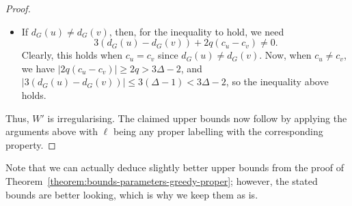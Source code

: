 \documentclass[a4paper,11pt,dvipsnames]{elsarticle}
\newcommand{\commenttext}[1]{ \begin{center} {\fbox{\begin{minipage}[h]{0.9 \linewidth}   {\textsf{ #1}} \end{minipage} }} \end{center}}
\newcommand{\Rom}[1]{{\color{blue}\commenttext{Rom : #1}}}
\newcommand{\Rom}[1]{}
\begin{document}
\begin{proof}
\begin{itemize}
    \item If $d_G(u) \neq d_G(v)$, then, for the inequality to hold, we need $$3(d_G(u)-d_G(v))+2q(c_u-c_v) \neq 0.$$ Clearly, this holds when $c_u = c_v$ since $d_G(u) \neq d_G(v)$. 
    Now, when $c_u \neq c_v$, we have $|2q(c_u-c_v)|\geq 2q > 3\Delta-2$, and $|3(d_G(u)-d_G(v))|\leq 3(\Delta-1) < 3\Delta - 2$, so the inequality above holds.
\end{itemize}

\noindent Thus, $W'$ is irregularising. %
The claimed upper bounds now follow by applying the arguments above with $\ell$ being any proper labelling with the corresponding property.
\end{proof}

Note that we can actually deduce slightly better upper bounds from the proof of Theorem~\ref{theorem:bounds-parameters-greedy-proper}; however, the stated bounds are better looking, which is why we keep them as is.


\end{document}
